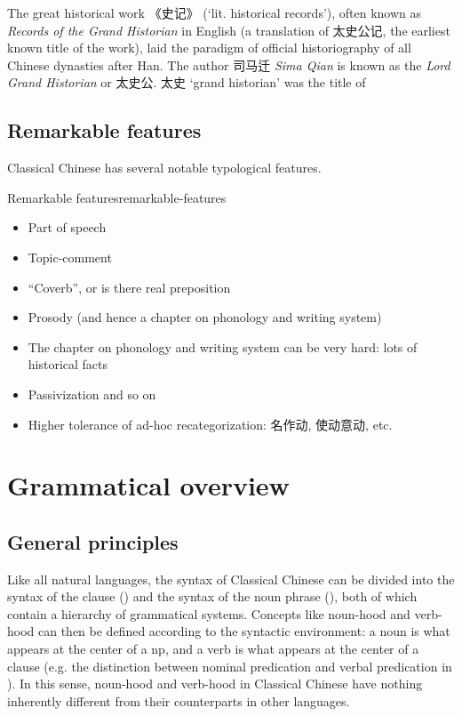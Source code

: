 \documentclass[UTF8, a4paper, oneside, scheme=plain, 12pt]{ctexrep}
\newcommand{\form}[1]{\emph{#1}}
\newcommand{\translate}[1]{`#1'}
\begin{document}
The great historical work 《史记》 (\translate{lit. historical records}),
often known as \form{Records of the Grand Historian} in English
(a translation of 太史公记, the earliest known title of the work),
laid the paradigm of official historiography of all Chinese dynasties after Han.
The author 司马迁 \form{Sima Qian} is known as the \form{Lord Grand Historian} or 太史公.
太史 \translate{grand historian} was the title of

\section{Remarkable features}

Classical Chinese has several notable typological features.

\begin{todobox}{Remarkable features}{remarkable-features}
    \begin{itemize}
        \item Part of speech
        \item Topic-comment
        \item ``Coverb'', or is there real preposition
        \item Prosody (and hence a chapter on phonology and writing system)
        \item The chapter on phonology and writing system can be very hard:
            lots of historical facts
        \item Passivization and so on
        \item Higher tolerance of ad-hoc recategorization: 名作动, 使动意动, etc.
    \end{itemize}
\end{todobox}

\chapter{Grammatical overview}

\section{General principles}\label{sec:grammatical.intro}

Like all natural languages, the syntax of Classical Chinese can be divided into 
the syntax of the clause () and the syntax of the noun phrase (),
both of which contain a hierarchy of grammatical systems.
Concepts like noun-hood and verb-hood can then be defined according to the syntactic environment:
a noun is what appears at the center of a \ac{np},
and a verb is what appears at the center of a clause
(e.g. the distinction between nominal predication and verbal predication 
in ).
In this sense, noun-hood and verb-hood in Classical Chinese have nothing inherently different from their counterparts in other languages.
\end{document}
